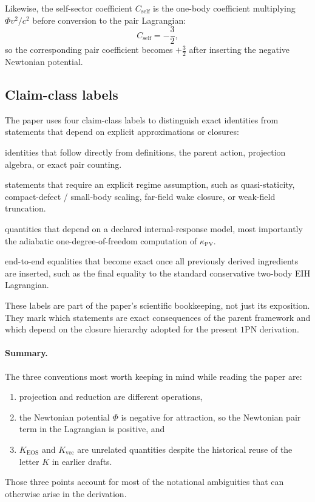 \documentclass[11pt]{article}
\newcommand{\kPV}{\kappa_{\mathrm{PV}}}
\newcommand{\Kvec}{K_{\mathrm{vec}}}
\newcommand{\KEOS}{K_{\mathrm{EOS}}}
\newcommand{\PhiN}{\Phi}
\newcommand{\Cself}{C_{\mathrm{self}}}
\newcommand{\Exact}{\textbf{Exact}}
\newcommand{\Controlled}{\textbf{Controlled reduction}}
\newcommand{\Protocol}{\textbf{Protocol closure}}
\newcommand{\FullMatch}{\textbf{Full assembly}}
\begin{document}
Likewise, the self-sector coefficient \(\Cself\) is the one-body coefficient multiplying
\(\PhiN v^2/c^2\) before conversion to the pair Lagrangian:
\begin{equation}
\Cself=-\frac32,
\label{eq:notation-Cself}
\end{equation}
so the corresponding pair coefficient becomes \(+\frac32\) after inserting the negative
Newtonian potential.

\subsection{Claim-class labels}
\label{app:notation-claimclasses}

The paper uses four claim-class labels to distinguish exact identities from statements
that depend on explicit approximations or closures:
\begin{description}[leftmargin=1.8em,style=nextline]
  \item[\Exact] identities that follow directly from definitions, the parent action,
  projection algebra, or exact pair counting.
  \item[\Controlled] statements that require an explicit regime assumption, such as
  quasi-staticity, compact-defect / small-body scaling, far-field wake closure, or
  weak-field truncation.
  \item[\Protocol] quantities that depend on a declared internal-response model, most
  importantly the adiabatic one-degree-of-freedom computation of \(\kPV\).
  \item[\FullMatch] end-to-end equalities that become exact once all previously derived
  ingredients are inserted, such as the final equality to the standard conservative
  two-body EIH Lagrangian.
\end{description}

These labels are part of the paper's scientific bookkeeping, not just its exposition.
They mark which statements are exact consequences of the parent framework and which depend
on the closure hierarchy adopted for the present \(1\)PN derivation.

\paragraph{Summary.}
The three conventions most worth keeping in mind while reading the paper are:
\begin{enumerate}[leftmargin=1.5em]
  \item projection and reduction are different operations,
  \item the Newtonian potential \(\PhiN\) is negative for attraction, so the Newtonian
  pair term in the Lagrangian is positive, and
  \item \(\KEOS\) and \(\Kvec\) are unrelated quantities despite the historical reuse of
  the letter \(K\) in earlier drafts.
\end{enumerate}
Those three points account for most of the notational ambiguities that can otherwise arise
in the derivation.
\end{document}
